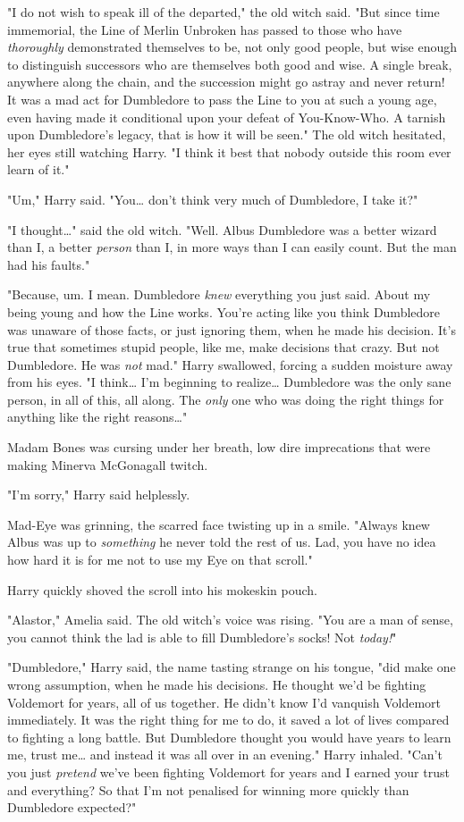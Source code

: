 "I do not wish to speak ill of the departed," the old witch said. "But since
time immemorial, the Line of Merlin Unbroken has passed to those who have
\emph{thoroughly} demonstrated themselves to be, not only good people, but wise
enough to distinguish successors who are themselves both good and wise. A
single break, anywhere along the chain, and the succession might go astray and
never return! It was a mad act for Dumbledore to pass the Line to you at such a
young age, even having made it conditional upon your defeat of You-Know-Who. A
tarnish upon Dumbledore's legacy, that is how it will be seen." The old witch
hesitated, her eyes still watching Harry. "I think it best that nobody outside
this room ever learn of it."

"Um," Harry said. "You{\ldots} don't think very much of Dumbledore, I take it?"

"I thought{\ldots}" said the old witch. "Well. Albus Dumbledore was a better
wizard than I, a better \emph{person} than I, in more ways than I can easily
count. But the man had his faults."

"Because, um. I mean. Dumbledore \emph{knew} everything you just said. About my
being young and how the Line works. You're acting like you think Dumbledore was
unaware of those facts, or just ignoring them, when he made his decision. It's
true that sometimes stupid people, like me, make decisions that crazy. But not
Dumbledore. He was \emph{not} mad." Harry swallowed, forcing a sudden moisture
away from his eyes. "I think{\ldots} I'm beginning to realize{\ldots}
Dumbledore was the only sane person, in all of this, all along. The \emph{only}
one who was doing the right things for anything like the right reasons{\ldots}"

Madam Bones was cursing under her breath, low dire imprecations that were
making Minerva McGonagall twitch.

"I'm sorry," Harry said helplessly.

Mad-Eye was grinning, the scarred face twisting up in a smile. "Always knew
Albus was up to \emph{something} he never told the rest of us. Lad, you have no
idea how hard it is for me not to use my Eye on that scroll."

Harry quickly shoved the scroll into his mokeskin pouch.

"Alastor," Amelia said. The old witch's voice was rising. "You are a man of
sense, you cannot think the lad is able to fill Dumbledore's socks! Not
\emph{today!}"

"Dumbledore," Harry said, the name tasting strange on his tongue, "did make one
wrong assumption, when he made his decisions. He thought we'd be fighting
Voldemort for years, all of us together. He didn't know I'd vanquish Voldemort
immediately. It was the right thing for me to do, it saved a lot of lives
compared to fighting a long battle. But Dumbledore thought you would have years
to learn me, trust me{\ldots} and instead it was all over in an evening." Harry
inhaled. "Can't you just \emph{pretend} we've been fighting Voldemort for years
and I earned your trust and everything? So that I'm not penalised for winning
more quickly than Dumbledore expected?"

